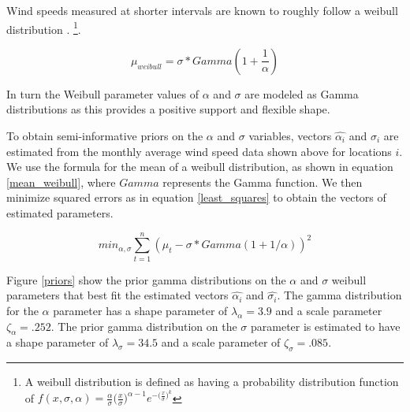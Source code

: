 \documentclass[11pt]{article}
\begin{document}
Wind speeds measured at shorter intervals are known to roughly follow a weibull distribution \citep{weibull_statistical_1951}. \footnote{A weibull distribution is defined as having a probability distribution function of $f(x, \sigma, \alpha) = \frac{\alpha}{\sigma} \big(\frac{x}{\sigma}\big)^{\alpha-1} e^{-\big(\frac{x}{\sigma}\big)^k}$}.

\begin{equation}
\mu_{weibull} = \sigma*Gamma(1+\frac{1}{\alpha})
\label{mean_weibull}
\end{equation}


In turn the Weibull parameter values of $\alpha$ and $\sigma$ are
modeled as Gamma distributions as this provides a positive support and flexible shape. 

To obtain semi-informative priors on the $\alpha$ and $\sigma$ variables, vectors $\hat{\alpha_i}$ and $\hat{\sigma_i}$ are estimated from the monthly average wind speed data shown above for locations $i$. We use the formula for the mean of a weibull distribution, as shown in equation \ref{mean_weibull}, where $Gamma$ represents the Gamma function. We then minimize squared errors as in equation \ref{least_squares} to obtain the vectors of estimated parameters. 

\begin{equation}
min_{\alpha,\sigma} \sum_{t=1}^n (\mu_t - \sigma*Gamma(1+1/\alpha))^2
\label{least_squares}
\end{equation}

Figure \ref{priors} show the prior gamma distributions on the $\alpha$ and $\sigma$ weibull parameters that best fit the estimated vectors $\hat{\alpha_i}$ and $\hat{\sigma_i}$. The gamma distribution for the $\alpha$ parameter has a shape parameter of $\lambda_{\alpha} = 3.9$ and a scale parameter $\zeta_{\alpha} = .252$. The prior gamma distribution on the $\sigma$ parameter is estimated to have a shape parameter of $\lambda_{\sigma} = 34.5$ and a scale parameter of $\zeta_{\sigma}=.085$.
\end{document}
